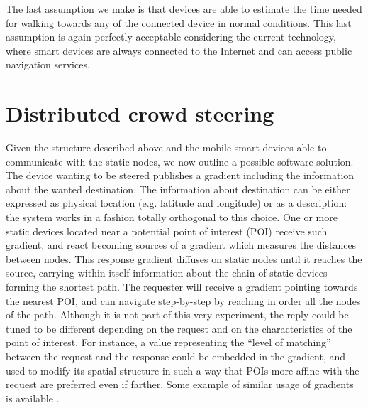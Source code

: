 \documentclass[12pt,a4paper,twoside,openright]{book}
\begin{document}
The last assumption we make is that devices are able to estimate the time needed for walking towards any of the connected device in normal conditions.
%
This last assumption is again perfectly acceptable considering the current technology, where smart devices are always connected to the Internet and can access public navigation services.

\section{Distributed crowd steering}

Given the structure described above and the mobile smart devices able to communicate with the static nodes, we now outline a possible software solution.
%
The device wanting to be steered publishes a gradient including the information about the wanted destination.
%
The information about destination can be either expressed as physical location (e.g. latitude and longitude) or as a description: the system works in a fashion totally orthogonal to this choice.
%
One or more static devices located near a potential point of interest (POI) receive such gradient, and react becoming sources of a gradient which measures the distances between nodes.
%
This response gradient diffuses on static nodes until it reaches the source, carrying within itself information about the chain of static devices forming the shortest path.
%
The requester will receive a gradient pointing towards the nearest POI, and can navigate step-by-step by reaching in order all the nodes of the path.
%
Although it is not part of this very experiment, the reply could be tuned to be different depending on the request and on the characteristics of the point of interest.
%
For instance, a value representing the ``level of matching'' between the request and the response could be embedded in the gradient, and used to modify its spatial structure in such a way that POIs more affine with the request are preferred even if farther.
%
Some example of similar usage of gradients is available \cite{SemMatchingSAC2013}.
\end{document}
